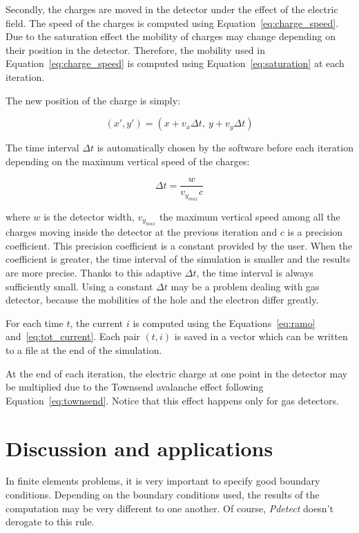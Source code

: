 \documentclass[11pt]{article}
\begin{document}
	Secondly, the charges are moved in the detector under the effect of the electric
	field. The speed of the charges is computed using Equation~\ref{eq:charge_speed}.
	Due to the saturation effect the mobility of charges may change depending on
	their position in the detector. Therefore, the mobility used in Equation~\ref{eq:charge_speed}
	is computed using Equation~\ref{eq:saturation} at each iteration.



	The new position of the charge is simply:

	\[(x',y') = (x + v_x \Delta t, \ y + v_y \Delta t)\]

	The time interval $\Delta t$ is automatically chosen by the software before
	each iteration depending on the maximum vertical speed of the charges:

	\[\Delta t = \frac{w}{v_{y_{max}} c}\]

	where $w$ is the detector width, $v_{y_{max}}$ the maximum vertical speed
	among all the charges moving inside the detector at the previous iteration and
	$c$ is a precision coefficient. This precision coefficient is a constant provided
	by the user. When the coefficient is greater, the time interval
	of the simulation is smaller and the results are more precise.
	Thanks to this adaptive $\Delta t$, the time interval is always sufficiently small.
	Using a constant $\Delta t$ may be a problem dealing with gas detector, because
	the mobilities of the hole and the electron differ greatly.

	For each time $t$, the current $i$ is computed using the Equations~\ref{eq:ramo}
	and~\ref{eq:tot_current}. Each pair $(t, i)$ is saved in a vector which can be
	written to a file at the end of the simulation.

	At the end of each iteration, the electric charge at one point in the detector
	may be multiplied due to the Townsend avalanche effect following Equation~\ref{eq:townsend}.
	Notice that this effect happens only for gas detectors.

\section{Discussion and applications}

	In finite elements problems, it is very important to specify good boundary conditions.
	Depending on the boundary conditions used, the results of the computation may be very
	different to one another. Of course, \textit{Pdetect} doesn't derogate to this rule.
\end{document}

